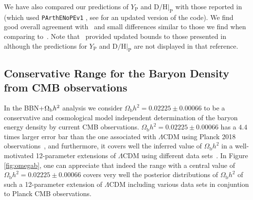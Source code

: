 We have also compared our predictions of $Y_{\mathrm{P}}$ and $\mathrm{D}/\mathrm{H}|_{\mathrm{P}}$ with those reported in~\cite{Boehm:2013jpa} (which used  \texttt{PArthENoPEv1} \cite{Pisanti:2007hk}, see \cite{Consiglio:2017pot} for an updated version of the code). We find good overall agreement with~\cite{Boehm:2013jpa} and small differences similar to those we find when comparing to~\cite{Nollett:2013pwa,Nollett:2014lwa}. Note that~\cite{Wilkinson:2016gsy} provided updated bounds to those presented in~\cite{Boehm:2013jpa} although the predictions for $Y_{\mathrm{P}}$ and $\mathrm{D}/\mathrm{H}|_{\mathrm{P}}$ are not displayed in that reference.

\subsection{Conservative Range for the Baryon Density from CMB observations} \label{app:Omegab}

In the BBN+$\Omega_{\rm b}h^2$ analysis we consider $\Omega_{\mathrm{b}} h^2 = 0.02225 \pm 0.00066$ to be a conservative and cosmological model independent determination of the baryon energy density by current CMB observations. $\Omega_{\mathrm{b}} h^2 = 0.02225 \pm 0.00066$ has a $4.4$ times larger error bar than the one associated with $\Lambda\text{CDM}$ using Planck 2018 observations~\cite{Aghanim:2018eyx}, and furthermore, it covers well the inferred value of $\Omega_{\mathrm{b}} h^2$ in a well-motivated 12-parameter extensions of $\Lambda$CDM using different data sets~\cite{DiValentino:2016hlg,DiValentino:2017zyq}. In Figure \ref{fig:omegab}, one can appreciate that indeed the range with a central value of $\Omega_{\mathrm{b}} h^2 = 0.02225 \pm 0.00066$ covers very well the posterior distributions of $\Omega_{\mathrm{b}} h^2 $ of such a 12-parameter extension of $\Lambda$CDM including various data sets in conjuntion to Planck CMB observations. 


